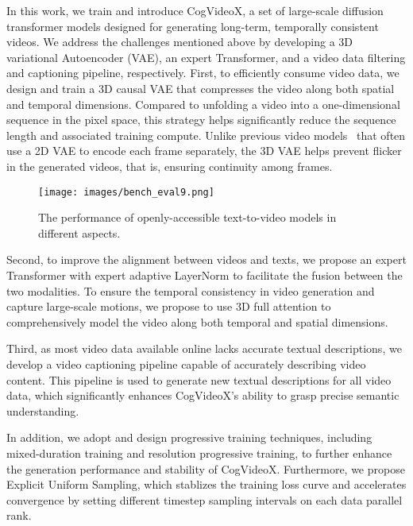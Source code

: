 \documentclass{article} \usepackage{iclr2024_conference,times}
\newcommand{\model}{CogVideoX\xspace}
\begin{document}
In this work, we train and introduce \model, a set of large-scale diffusion transformer models designed for generating long-term, temporally consistent videos. 
We address the challenges mentioned above by developing a 3D variational Autoencoder (VAE), an expert Transformer, and a video data filtering and captioning pipeline, respectively. 
First, to efficiently consume video data, we design and train a 3D causal VAE that compresses the video along both spatial and temporal dimensions. 
Compared to unfolding a video into a one-dimensional sequence in the pixel space, this strategy helps significantly reduce the sequence length and associated training compute. 
Unlike previous video models~\cite{blattmann2023stable} that often use a 2D VAE to encode each frame separately, the 3D VAE helps prevent flicker in the generated videos, that is, ensuring continuity among frames. 





\begin{figure}
\centering
\texttt{[image: images/bench\_eval9.png]}
\caption{The performance of openly-accessible text-to-video models in different aspects.}
\label{fig:radar}


\end{figure}



Second, to improve the alignment between videos and texts, we propose an expert Transformer with  expert adaptive LayerNorm to facilitate the fusion between the two modalities. 
To ensure the temporal consistency in video generation and  capture large-scale motions, we propose to use 3D full attention to comprehensively model the video along both temporal and spatial dimensions. 

Third, as most video data available online lacks accurate textual descriptions, we develop a video captioning pipeline capable of accurately describing video content. 
This pipeline is used to generate new textual descriptions for all video data, which significantly enhances \model's ability to grasp precise semantic understanding. 


In addition, we adopt and design progressive training techniques, including mixed-duration training and resolution progressive training, to further enhance the generation performance and stability of \model. Furthermore, we propose Explicit Uniform Sampling, which stablizes the training loss curve and accelerates convergence by setting different timestep sampling intervals on each data parallel rank.
\end{document}

